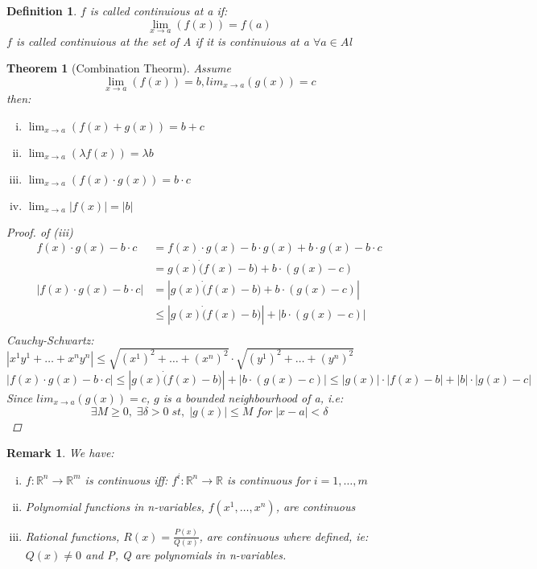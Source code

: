 \documentclass[12pt]{article}
\def\RR{\mathbb{R}}
\newtheorem{theorem}{Theorem}[section]
\newtheorem{definition}{Definition}[section]
\newtheorem*{remark}{Remark}
\begin{document}
\begin{definition}
$f$ is called continuious at a if:
\[\lim_{x\to a} (f(x))=f(a)\]
$f$ is called continuious at the set of A if it is continuious at a $\forall a \in A$l
\end{definition}

\begin{theorem}[Combination Theorm]\label{T:Combination Theorm}
Assume \[\lim_{x\to a} (f(x))=b, lim_{x\to a} (g(x))=c\]
then:
\begin{enumerate}[(i)]
\item$\lim_{x\to a} (f(x) + g(x))=b+c$
\item$\lim_{x\to a} (\lambda f(x))=\lambda b$
\item$\lim_{x\to a} (f(x)\cdot g(x))=b\cdot c$
\item$\lim_{x\to a} |f(x)|=|b|$
\end{enumerate}
\begin{proof}
of (iii)
\begin{align*}
f(x)\cdot g(x)-b\cdot c &= f(x)\cdot g(x) -b\cdot g(x) + b\cdot g(x) -b\cdot c \\
&= g(x)\dot (f(x)-b) + b\cdot (g(x) - c) \\
|f(x)\cdot g(x)-b\cdot c|&= |g(x)\dot (f(x)-b) + b\cdot (g(x) - c)|\\
 &\leq |g(x)\dot (f(x)-b)| +| b\cdot (g(x) - c)|\\
\end{align*}
Cauchy-Schwartz: $|x^{1}y^{1} + \dots +x^{n}y^{n}| \leq \sqrt{(x^{1})^{2} + \dots +(x^{n})^{2}} \cdot \sqrt{(y^{1})^{2} + \dots +(y^{n})^{2}}$
\[|f(x)\cdot g(x)-b\cdot c| \leq |g(x)\dot (f(x)-b)| +| b\cdot (g(x) - c)|  \leq |g(x)|\cdot |f(x)-b| +|b|\cdot |g(x) - c|\]
Since $ lim_{x\to a} (g(x))=c$, $g$ is a bounded neighbourhood of a, i.e: 
\[
\exists M  \geq 0, \; \exists \delta > 0 \; st,\; 
|g(x)| \leq M \; for \; |x-a|<\delta\] 
\end{proof}
\end{theorem}

\begin{remark} We have:\\
\begin{enumerate}[(i)]
\item $f:\RR^{n} \rightarrow \RR^{m}$ is continuous iff: $f^{i}:\RR^{n} \rightarrow \RR$ is continuous for $i=1,\dots , m$
\item Polynomial functions in n-variables, $f(x^{1}, \dots ,x^{n})$, are continuous
\item Rational functions, $R(x)= \frac{P(x)}{Q(x)}$, are continuous where defined, ie: $Q(x) \neq 0$ and P, Q are polynomials in n-variables.
\end{enumerate}
\end{remark}
\end{document}
